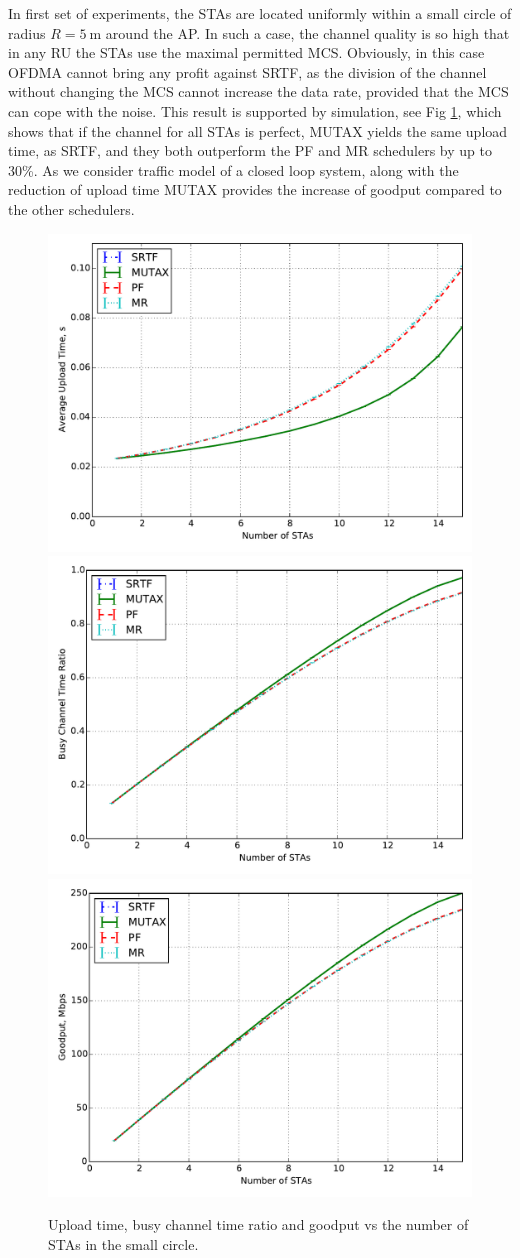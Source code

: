 In first set of experiments, the STAs are located uniformly within a small circle of radius $R = \SI{5}{\m}$ around the AP.
In such a case, the channel quality is so high that in any RU the STAs use the maximal permitted MCS.
Obviously, in this case OFDMA cannot bring any profit against SRTF, as the division of the channel without changing the MCS cannot increase the data rate, provided that the MCS can cope with the noise.
This result is supported by simulation, see Fig \ref{fig:10-e}, which shows that if the channel for all STAs is perfect, MUTAX yields the same upload time, as SRTF, and they both outperform the PF and MR schedulers by up to 30\%. 
As we consider traffic model of a closed loop system, along with the reduction of upload time MUTAX provides the increase of goodput compared to the other schedulers.

\begin{figure}[!tb]
\centering
\includegraphics[width = 0.32\linewidth]{5-d.pdf}
\includegraphics[width = 0.32\linewidth]{5-e.pdf}
\includegraphics[width = 0.32\linewidth]{5-t.pdf}
%
\vspace{-0.5em}
\caption{\label{fig:10-e}  Upload time, busy channel time ratio and goodput vs the number of STAs in the small circle.}
\vspace{-0.5em}
\end{figure}

